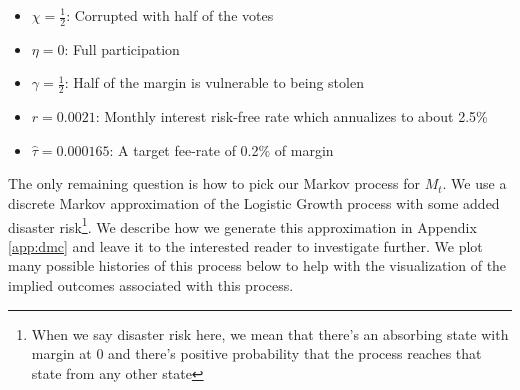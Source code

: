 \begin{itemize}
  \item $\chi = \frac{1}{2}$: Corrupted with half of the votes
  \item $\eta = 0$: Full participation
  \item $\gamma = \frac{1}{2}$: Half of the margin is vulnerable to being stolen
  \item $r = 0.0021$: Monthly interest risk-free rate which annualizes to about 2.5\%
  \item $\hat{\tau} = 0.000165$: A target fee-rate of 0.2\% of margin
\end{itemize}

The only remaining question is how to pick our Markov process for $M_t$. We use a discrete Markov
approximation of the Logistic Growth process with some added disaster risk\footnote{When we say
disaster risk here, we mean that there's an absorbing state with margin at 0 and there's positive
probability that the process reaches that state from any other state}. We describe how we
generate this approximation in Appendix \ref{app:dmc} and leave it to the interested reader to
investigate further. We plot many possible histories of this process below to help with the
visualization of the implied outcomes associated with this process.

\begin{center}
  \begin{figure}[H]
    \label{fig:sm_stochastic_margin_growth}
  \end{figure}
\end{center}

